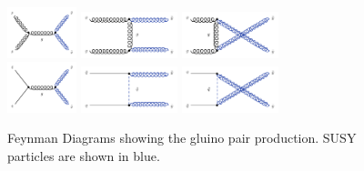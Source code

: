 \begin{figure}[!h]
\centering
  \includegraphics[width=0.18\textwidth]{Plots/feyndiagrams/gluinoprod_sch1.pdf}
   \includegraphics[width=0.25\textwidth]{Plots/feyndiagrams/gluinoprod_tch1.pdf}
   \includegraphics[width=0.25\textwidth]{Plots/feyndiagrams/gluinoprod_uch1.pdf}
  \\
    \includegraphics[width=0.18\textwidth]{Plots/feyndiagrams/gluinoprod_sch2.pdf}
   \includegraphics[width=0.25\textwidth]{Plots/feyndiagrams/gluinoprod_tch2.pdf}
    \includegraphics[width=0.25\textwidth]{Plots/feyndiagrams/gluinoprod_uch2.pdf}

  \caption[Feynman diagrams for the gluino pair production]{\label{fig:gluProd}Feynman  Diagrams showing the gluino pair production.
  SUSY particles are  shown in blue.
  }
\end{figure}

